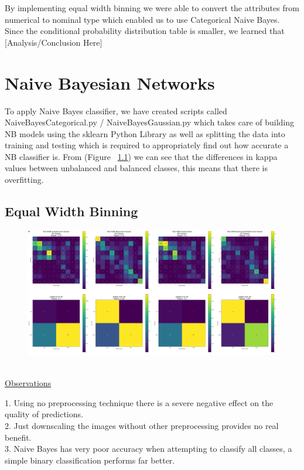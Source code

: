 \documentclass[11pt]{article}
\begin{document}
By implementing equal width binning we were able to convert the attributes from numerical to nominal type which enabled us to use Categorical Naive Bayes. 
Since the conditional probability distribution table is smaller, we learned that {\huge [Analysis/Conclusion Here]}

\pagebreak

\section{Naive Bayesian Networks}
To apply Naive Bayes classifier, we have created scripts called NaiveBayesCategorical.py 
/ NaiveBayesGaussian.py which takes care of building NB models using the sklearn Python Library
as well as splitting the data into training and testing which is required to appropriately find 
out how accurate a NB classifier is. From (Figure ~\ref{NaiveBayesEWBConfMat}) we can see that the 
differences in kappa values between unbalanced and balanced classes, this means that there is overfitting.

\subsection{Equal Width Binning}\label{NaiveBayesEWBConfMat}
\begin{figure}[h!]
  \centering
  \includegraphics[scale=0.15]{Images/NaiveBayesEWBMatrices.png}
\end{figure}
{\color{red}{\large IMAGE NEEDS RESIZING TO READ TEXT}}
\\
\underline{Observations}
\par
1. Using no preprocessing technique there is a severe negative effect on the quality of predictions. \\
2. Just downscaling the images without other preprocessing provides no real benefit. \\
3. Naive Bayes has very poor accuracy when attempting to classify all classes, a simple binary classification performs far better.
\end{document}
